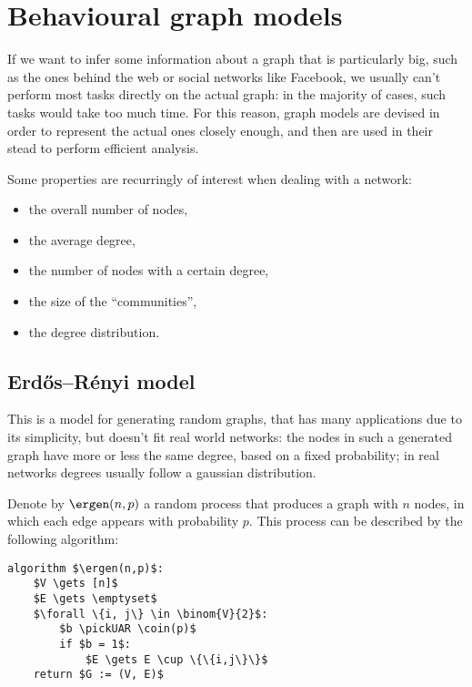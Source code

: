 \chapter{Behavioural graph models}\label{sec:users-behaviors}

If we want to infer some information about a graph that is particularly big, such as the ones behind the web or social networks like Facebook, we usually can't perform most tasks directly on the actual graph: in the majority of cases, such tasks would take too much time. For this reason, graph models are devised in order to represent the actual ones closely enough, and then are used in their stead to perform efficient analysis.

Some properties are recurringly of interest when dealing with a network:
\begin{itemize}
    \item the overall number of nodes,
    \item the average degree,
    \item the number of nodes with a certain degree,
    \item the size of the ``communities'',
    \item the degree distribution.
\end{itemize}

\section{Erd\H{o}s–Rényi model}\label{sec:gnp}
    
This is a model for generating random graphs, that has many applications due to its simplicity, but doesn't fit real world networks: the nodes in such a generated graph have more or less the same degree, based on a fixed probability; in real networks degrees usually follow a gaussian distribution.

Denote by $\ergen(n, p)$ a random process that produces a graph with $n$ nodes, in which each edge appears with probability $p$. This process can be described by the following algorithm:

\begin{lstlisting}[caption = {The $\ergen(n,p)$ algorithm}, label = {lst:gnp}]
algorithm $\ergen(n,p)$:
    $V \gets [n]$
    $E \gets \emptyset$
    $\forall \{i, j\} \in \binom{V}{2}$:
        $b \pickUAR \coin(p)$
        if $b = 1$:
            $E \gets E \cup \{\{i,j\}\}$
    return $G := (V, E)$
\end{lstlisting}

